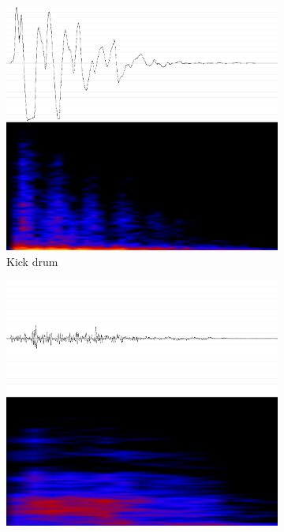 \begin{figure}[h]
	\centering
	\begin{subfigure}[b]{0.275\textwidth}
		\includegraphics[width=\textwidth]{fig/Kick-wave.png}
		\caption{Kick drum}
		\label{fig:kick-wave}
	\end{subfigure}
	\begin{subfigure}[b]{0.275\textwidth}
		\includegraphics[width=\textwidth]{fig/Snare-wave.png}

\end{subfigure}
\end{figure}
